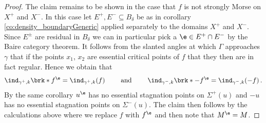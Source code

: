 \begin{proof}
  
  

  The claim remains to be shown in the case that $f$ is not strongly Morse on $X^+$ and $X^-$. In this case let
  $E^+,E^-\subseteq B_\delta$ be as in corollary \ref{co:density_boundaryGeneric} applied separately to the domains $X^+$ and $X^-$.
  Since $E^\pm$ are residual in $B_\delta$ we can in particular pick a $\e\in E^+\cap E^-$ by the Baire category theorem.
  It follows from the slanted angles at which $\Gamma$ approaches $\gamma$ that if the points $x_1$, $x_2$ are essential critical points of $f$
  that they then are in fact regular.
  Hence we obtain that
  \begin{align}
    \ind_{\gamma^+,k}\brk*{f^\e}=\ind_{\gamma^+,k}(f)\qquad\text{ and }\qquad 
    \ind_{\gamma^-,k}\brk*{-f^\e}=\ind_{\gamma^-,k}(-f)\,.
    \label{eq:n3_disproof_morse_indexApprox}
  \end{align}
  By the same corollary $u^\e$ has no essential stagnation points on $\Sigma^+(u)$
  and $-u$ has no essential stagnation points on $\Sigma^-(u)$.
  The claim then follows by the calculations above where we replace
  $f$ with $f^\e$ and then note that $M^\e=M$.
\end{proof}
